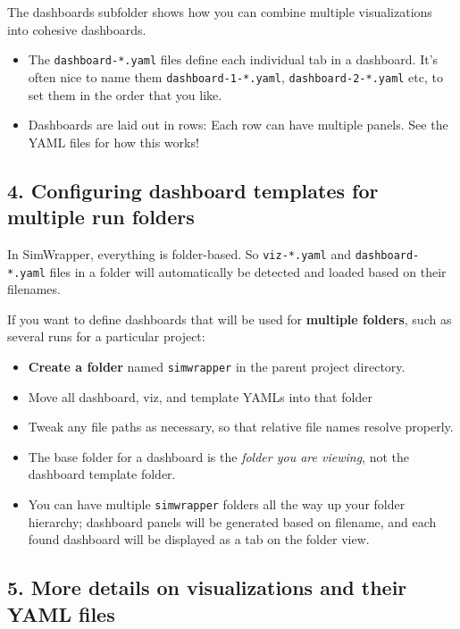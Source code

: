 The dashboards subfolder shows how you can combine multiple
visualizations into cohesive dashboards.

\begin{itemize}
\tightlist
\item
  The \texttt{dashboard-*.yaml} files define each individual tab in a
  dashboard. It's often nice to name them \texttt{dashboard-1-*.yaml},
  \texttt{dashboard-2-*.yaml} etc, to set them in the order that you
  like.
\item
  Dashboards are laid out in rows: Each row can have multiple panels.
  See the YAML files for how this works!
\end{itemize}

\hypertarget{configuring-dashboard-templates-for-multiple-run-folders}{%
\subsection{4. Configuring dashboard templates for multiple run
folders}\label{configuring-dashboard-templates-for-multiple-run-folders}}

In SimWrapper, everything is folder-based. So \texttt{viz-*.yaml} and
\texttt{dashboard-*.yaml} files in a folder will automatically be
detected and loaded based on their filenames.

If you want to define dashboards that will be used for \textbf{multiple
folders}, such as several runs for a particular project:

\begin{itemize}
\tightlist
\item
  \textbf{Create a folder} named \texttt{simwrapper} in the parent
  project directory.
\item
  Move all dashboard, viz, and template YAMLs into that folder
\item
  Tweak any file paths as necessary, so that relative file names resolve
  properly.
\item
  The base folder for a dashboard is the \emph{folder you are viewing},
  not the dashboard template folder.
\item
  You can have multiple \texttt{simwrapper} folders all the way up your
  folder hierarchy; dashboard panels will be generated based on
  filename, and each found dashboard will be displayed as a tab on the
  folder view.
\end{itemize}

\hypertarget{more-details-on-visualizations-and-their-yaml-files}{%
\subsection{5. More details on visualizations and their YAML
files}\label{more-details-on-visualizations-and-their-yaml-files}}

